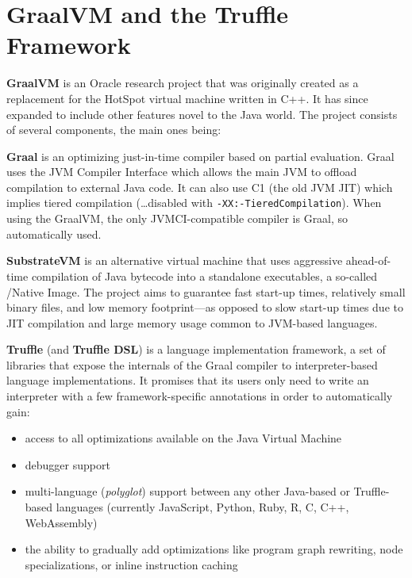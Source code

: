 \documentclass[english,zadani,odsaz]{fitthesis}
\begin{document}
\section{GraalVM and the Truffle Framework}
\label{sec:org8db15c0}

\textbf{GraalVM} is an Oracle research project that was originally created as a
replacement for the HotSpot virtual machine written in C++.  It has since expanded to include other features novel to the Java world.
The project consists of several components, the main ones being:

\textbf{Graal} is an optimizing just-in-time compiler based on partial evaluation. Graal
uses the JVM Compiler Interface which allows the main JVM to offload compilation
to external Java code. It can also use C1 (the old JVM JIT) which implies tiered
compilation (\ldots{}disabled with \texttt{-XX:-TieredCompilation}). When using the GraalVM,
the only JVMCI-compatible compiler is Graal, so automatically
used. 

\textbf{SubstrateVM} is an alternative virtual machine that uses aggressive ahead-of-time
compilation  of Java bytecode into a standalone
executables, a so-called /Native Image. The project aims to guarantee fast
start-up times, relatively small binary files, and low memory footprint---as
opposed to slow start-up times due to JIT compilation and large memory usage
common to JVM-based languages.

\textbf{Truffle} (and \textbf{Truffle DSL}) is a language implementation framework, a set of
libraries that expose the internals of the Graal compiler to interpreter-based
language implementations. It promises that its users only need to write an
interpreter with a few framework-specific annotations in order to automatically
gain:
\begin{itemize}
\item access to all optimizations available on the Java Virtual Machine
\item debugger support
\item multi-language (\emph{polyglot}) support between any other Java-based or
Truffle-based languages (currently JavaScript, Python, Ruby, R, C, C++, WebAssembly)
\item the ability to gradually add optimizations like program graph rewriting,
node specializations, or inline instruction caching
\end{itemize}
\end{document}
